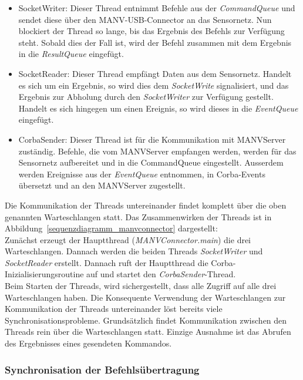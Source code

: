 \begin{itemize}
    \item{SocketWriter:} Dieser Thread entnimmt Befehle aus der \textsl{CommandQueue} und sendet
                         diese über den MANV-USB-Connector an das Sensornetz. Nun blockiert der
                         Thread so lange, bis das Ergebnis des Befehls zur Verfügung steht.
                         Sobald dies der Fall ist, wird der Befehl zusammen mit dem Ergebnis in
                         die \textsl{ResultQueue} eingefügt.
    \item{SocketReader:} Dieser Thread empfängt Daten aus dem Sensornetz. Handelt es sich um ein
                         Ergebnis, so wird dies dem \textsl{SocketWrite} signalisiert, und das
                         Ergebnis zur Abholung durch den \textsl{SocketWriter} zur Verfügung
                         gestellt. Handelt es sich hingegen um einen Ereignis, so wird dieses
                         in die \textsl{EventQueue} eingefügt.
    \item{CorbaSender:} Dieser Thread ist für die Kommunikation mit MANVServer zuständig.
                         Befehle, die vom MANVServer empfangen werden, werden für das 
                         Sensornetz aufbereitet und in die CommandQueue eingestellt.
                         Ausserdem werden Ereignisse aus der \textsl{EventQueue} entnommen,
                         in Corba-Events übersetzt und an den MANVServer zugestellt.
\end{itemize}                          

Die Kommunikation der Threads untereinander findet komplett über die oben genannten Warteschlangen statt. Das Zusammenwirken der Threads
ist in Abbildung~\ref{sequenzdiagramm_manvconnector} dargestellt:\\

Zunächst erzeugt der Hauptthread (\emph{MANVConnector.main}) die drei Warteschlangen. Dannach werden die beiden Threads
\emph{SocketWriter} und \emph{SocketReader} erstellt. Dannach ruft der Hauptthread die Corba-Inizialisierungsroutine auf und startet
den \emph{CorbaSender}-Thread.\\

Beim Starten der Threads, wird sichergestellt, dass alle Zugriff auf alle drei Warteschlangen haben. Die Konsequente Verwendung
der Warteschlangen zur Kommunikation der Threads untereinander löst bereits viele Synchronisationsprobleme. Grundsätzlich findet
Kommunikation zwischen den Threads rein über die Warteschlangen statt. Einzige Ausnahme ist das Abrufen des Ergebnisses eines
gesendeten Kommandos. 

\subsubsection{Synchronisation der Befehlsübertragung}
